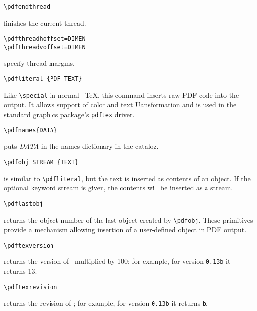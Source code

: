 \begin{verbatim}
\pdfendthread 
\end{verbatim}

finishes the current thread. 
 
\begin{verbatim}
\pdfthreadhoffset=DIMEN 
\pdfthreadvoffset=DIMEN 
\end{verbatim}

specify thread margins. 


\begin{verbatim}
\pdfliteral {PDF TEXT} 
\end{verbatim}

Like \verb|\special| in normal \ \TeX, this command inserts raw PDF code
into the output. It allows support of color and text Uansformation and
is used in the standard graphics package's \verb|pdftex| driver. 

\begin{verbatim}
\pdfnames{DATA} 
\end{verbatim}

puts \emph{DATA} in the names dictionary in the catalog. 

\begin{verbatim}
\pdfobj STREAM {TEXT} 
\end{verbatim}

is similar to \verb|\pdfliteral|, but the text is inserted as contents of an object. If the 
optional keyword stream is given, the contents will be inserted as a stream. 

\begin{verbatim}
\pdflastobj 
\end{verbatim}

returns the object number of the last object created by \verb|\pdfobj|. These primitives 
provide a mechanism allowing insertion of a user-defined object in PDF output. 

\begin{verbatim}
\pdftexversion 
\end{verbatim}

returns the version of \pdfTEX\  multiplied by 100; for example, for version \verb|0.13b| it 
returns 13. 

\begin{verbatim}
\pdftexrevision 
\end{verbatim}

returns the revision of \pdfTEX; for example, for version \verb|0.13b| it returns \verb|b|. 

